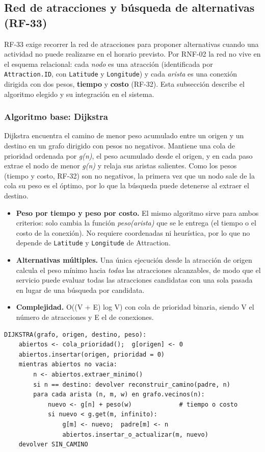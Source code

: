 \documentclass[11pt,a4paper]{article}
\begin{document}
\subsection{Red de atracciones y búsqueda de alternativas (RF-33)}\label{sec:red}
RF-33 exige recorrer la red de atracciones para proponer alternativas cuando una actividad no puede realizarse en el horario previsto. Por RNF-02 la red no vive en el esquema relacional: cada \textit{nodo} es una atracción (identificada por \texttt{Attraction.ID}, con \texttt{Latitude} y \texttt{Longitude}) y cada \textit{arista} es una conexión dirigida con dos pesos, \textbf{tiempo} y \textbf{costo} (RF-32). Esta subsección describe el algoritmo elegido y su integración en el sistema.

\subsubsection{Algoritmo base: Dijkstra}
Dijkstra encuentra el camino de menor peso acumulado entre un origen y un destino en un grafo dirigido con pesos no negativos. Mantiene una cola de prioridad ordenada por \textit{g(n)}, el peso acumulado desde el origen, y en cada paso extrae el nodo de menor \textit{g(n)} y relaja sus aristas salientes. Como los pesos (tiempo y costo, RF-32) son no negativos, la primera vez que un nodo sale de la cola su peso es el óptimo, por lo que la búsqueda puede detenerse al extraer el destino.

\begin{itemize}[leftmargin=1.2em,itemsep=2pt,topsep=3pt]
\item \textbf{Peso por tiempo y peso por costo.} El mismo algoritmo sirve para ambos criterios: solo cambia la función \textit{peso(arista)} que se le entrega (el tiempo o el costo de la conexión). No requiere coordenadas ni heurística, por lo que no depende de \texttt{Latitude} y \texttt{Longitude} de Attraction.
\item \textbf{Alternativas múltiples.} Una única ejecución desde la atracción de origen calcula el peso mínimo hacia \textit{todas} las atracciones alcanzables, de modo que el servicio puede evaluar todas las atracciones candidatas con una sola pasada en lugar de una búsqueda por candidata.
\item \textbf{Complejidad.} O((V + E) log V) con cola de prioridad binaria, siendo V el número de atracciones y E el de conexiones.
\end{itemize}

\begin{Verbatim}[fontsize=\scriptsize,frame=single,framesep=2mm]
DIJKSTRA(grafo, origen, destino, peso):
    abiertos <- cola_prioridad();  g[origen] <- 0
    abiertos.insertar(origen, prioridad = 0)
    mientras abiertos no vacia:
        n <- abiertos.extraer_minimo()
        si n == destino: devolver reconstruir_camino(padre, n)
        para cada arista (n, m, w) en grafo.vecinos(n):
            nuevo <- g[n] + peso(w)             # tiempo o costo
            si nuevo < g.get(m, infinito):
                g[m] <- nuevo;  padre[m] <- n
                abiertos.insertar_o_actualizar(m, nuevo)
    devolver SIN_CAMINO
\end{Verbatim}
\end{document}
